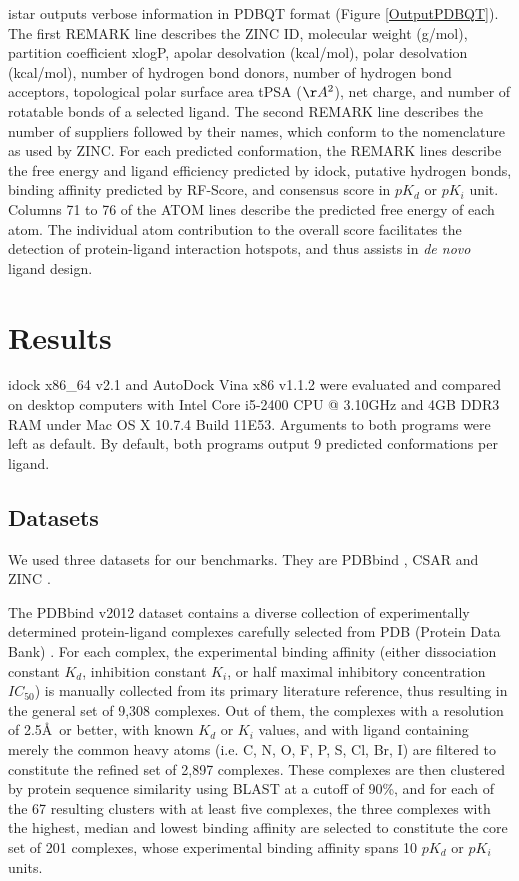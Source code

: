 \documentclass[10pt]{article}
\begin{document}
istar outputs verbose information in PDBQT format (Figure \ref{OutputPDBQT}). The first REMARK line describes the ZINC ID, molecular weight (g/mol), partition coefficient xlogP, apolar desolvation (kcal/mol), polar desolvation (kcal/mol), number of hydrogen bond donors, number of hydrogen bond acceptors, topological polar surface area tPSA ($\AA^2$), net charge, and number of rotatable bonds of a selected ligand. The second REMARK line describes the number of suppliers followed by their names, which conform to the nomenclature as used by ZINC. For each predicted conformation, the REMARK lines describe the free energy and ligand efficiency predicted by idock, putative hydrogen bonds, binding affinity predicted by RF-Score, and consensus score in $pK_d$ or $pK_i$ unit. Columns 71 to 76 of the ATOM lines describe the predicted free energy of each atom. The individual atom contribution to the overall score facilitates the detection of protein-ligand interaction hotspots, and thus assists in \textit{de novo} ligand design.

\section*{Results}
idock x86\_64 v2.1 and AutoDock Vina x86 v1.1.2 were evaluated and compared on desktop computers with Intel Core i5-2400 CPU @ 3.10GHz and 4GB DDR3 RAM under Mac OS X 10.7.4 Build 11E53. Arguments to both programs were left as default. By default, both programs output 9 predicted conformations per ligand.

\subsection*{Datasets}
We used three datasets for our benchmarks. They are PDBbind \cite{529,530}, CSAR \cite{857,960} and ZINC \cite{532,1178}.

The PDBbind v2012 dataset contains a diverse collection of experimentally determined protein-ligand complexes carefully selected from PDB (Protein Data Bank) \cite{540,537}. For each complex, the experimental binding affinity (either dissociation constant $K_d$, inhibition constant $K_i$, or half maximal inhibitory concentration $IC_{50}$) is manually collected from its primary literature reference, thus resulting in the general set of 9,308 complexes. Out of them, the complexes with a resolution of 2.5\AA\ or better, with known $K_d$ or $K_i$ values, and with ligand containing merely the common heavy atoms (i.e. C, N, O, F, P, S, Cl, Br, I) are filtered to constitute the refined set of 2,897 complexes. These complexes are then clustered by protein sequence similarity using BLAST at a cutoff of 90\%, and for each of the 67 resulting clusters with at least five complexes, the three complexes with the highest, median and lowest binding affinity are selected to constitute the core set of 201 complexes, whose experimental binding affinity spans 10 $pK_d$ or $pK_i$ units.
\end{document}
